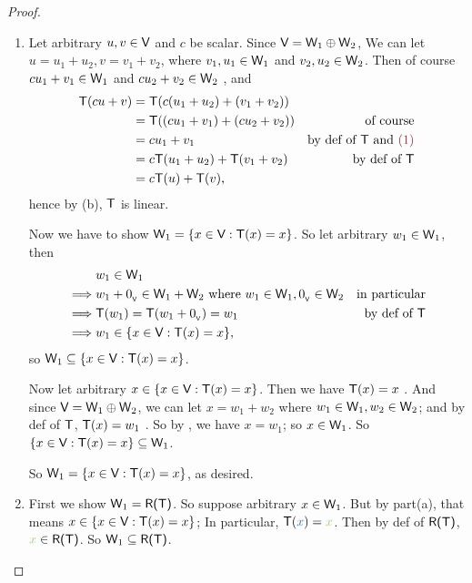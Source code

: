 \begin{proof} \ 
\begin{enumerate}
\item
Let arbitrary \(u, v \in \textsf{V}\) and \(c\) be scalar.
Since \(\textsf{V} = \textsf{W}_1 \oplus \textsf{W}_2\), We can let \(u = u_1 + u_2, v = v_1 + v_2\), where \(v_1, u_1 \in \textsf{W}_1\) and \(v_2, u_2 \in \textsf{W}_2\).
Then of course \(c u_1 + v_1 \in \textsf{W}_1\) and \(c u_2 + v_2 \in \textsf{W}_2\) \MAROON{(1)}, and
\begin{align*}
    \T(cu + v) & = \T(c(u_1 + u_2) + (v_1 + v_2)) \\
               & = \T((c u_1 + v_1) + (c u_2 + v_2)) & \text{of course} \\
               & = c u_1 + v_1 & \text{by def of \(\T\) and \MAROON{(1)}} \\
               & = c \T(u_1 + u_2) + \T(v_1 + v_2) & \text{by def of \(\T\)} \\
               & = c \T(u) + \T(v),
\end{align*}
hence by (b), \(\textsf{T}\) is linear.

Now we have to show \(\textsf{W}_1 = \{ x \in \textsf{V} : \textsf{T}(x) = x \}\).
So let arbitrary \(w_1 \in \textsf{W}_1\), then
\begin{align*}
             & w_1 \in \textsf{W}_1 \\
    \implies & w_1 + 0_{_{\textsf{V}}} \in \textsf{W}_1 + \textsf{W}_2 \text{ where } w_1 \in \textsf{W}_1, 0_{_{\textsf{V}}} \in \textsf{W}_2 & \text{in particular} \\
    \implies & \textsf{T}(w_1) = \textsf{T}(w_1 + 0_{_{\textsf{V}}}) = w_1 & \text{by def of \(\textsf{T}\)} \\
    \implies & w_1 \in \{ x \in \textsf{V} : \textsf{T}(x) = x \},
\end{align*}
so \(\textsf{W}_1 \subseteq \{ x \in \textsf{V} : \textsf{T}(x) = x \}\).

Now let arbitrary \(x \in \{ x \in \textsf{V} : \textsf{T}(x) = x \}\).
Then we have \(\textsf{T}(x) = x\) .
And since \(\textsf{V} = \textsf{W}_1 \oplus \textsf{W}_2\), we can let \(x = w_1 + w_2\) where \(w_1 \in \textsf{W}_1, w_2 \in \textsf{W}_2\);
and by def of \(\textsf{T}\), \(\textsf{T}(x) = w_1\) \MAROON{(3)}.
So by , we have \(x = w_1\); so \(x \in \textsf{W}_1\).
So \(\{ x \in \textsf{V} : \textsf{T}(x) = x \} \subseteq \textsf{W}_1\).

So \(\textsf{W}_1 = \{ x \in \textsf{V} : \textsf{T}(x) = x\}\), as desired.

\item
First we show \(\textsf{W}_1 = \textsf{R(T)}\).
So suppose arbitrary \(x \in \textsf{W}_1\).
But by part(a), that means \(x \in \{x \in \textsf{V} : \textsf{T}(x) = x\}\);
In particular, \(\T(\BLUE{x}) = \GREEN{x}\).
Then by def of \(\textsf{R(T)}\), \(\GREEN{x} \in \RANGET\).
So \(\textsf{W}_1 \subseteq \textsf{R(T)}\).


\end{enumerate}
\end{proof}
